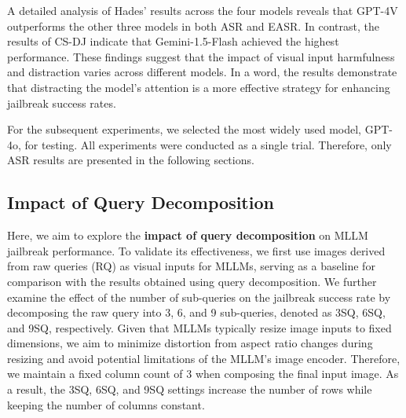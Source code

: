 A detailed analysis of Hades’ results across the four models reveals that GPT-4V outperforms the other three models in both ASR and EASR. In contrast, the results of CS-DJ indicate that Gemini-1.5-Flash achieved the highest performance. These findings suggest that the impact of visual input harmfulness and distraction varies across different models. In a word, the results demonstrate that distracting the model’s attention is a more effective strategy for enhancing jailbreak success rates.

For the subsequent experiments, we selected the most widely used model, GPT-4o, for testing. All experiments were conducted as a single trial. Therefore, only ASR results are presented in the following sections.



\subsection{Impact of Query Decomposition}



Here, we aim to explore the \textbf{impact of query decomposition} on MLLM jailbreak performance. To validate its effectiveness, we first use images derived from raw queries (RQ) as visual inputs for MLLMs, serving as a baseline for comparison with the results obtained using query decomposition. We further examine the effect of the number of sub-queries on the jailbreak success rate by decomposing the raw query into 3, 6, and 9 sub-queries, denoted as 3SQ, 6SQ, and 9SQ, respectively. Given that MLLMs typically resize image inputs to fixed dimensions, we aim to minimize distortion from aspect ratio changes during resizing and avoid potential limitations of the MLLM’s image encoder. Therefore, we maintain a fixed column count of 3 when composing the final input image. As a result, the 3SQ, 6SQ, and 9SQ settings increase the number of rows while keeping the number of columns constant.


